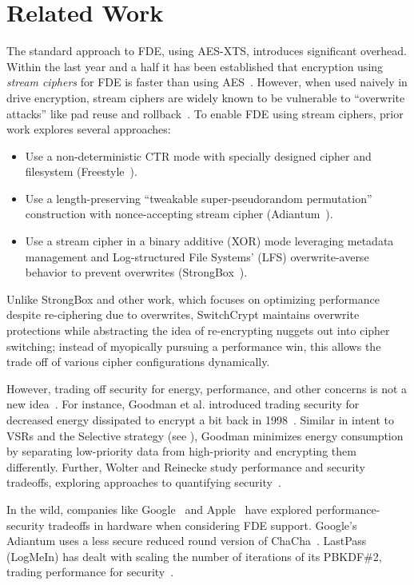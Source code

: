 \section{Related Work}\label{sec:related}

The standard approach to FDE, using AES-XTS, introduces significant overhead.
Within the last year and a half it has been established that encryption using
\emph{stream ciphers} for FDE is faster than using AES~\cite{StrongBox,
AnotherPaper1, AnotherPaper2}. However, when used naively in drive encryption,
stream ciphers are widely known to be vulnerable to ``overwrite attacks'' like
pad reuse and rollback~\cite{KatzLindell, StrongBox}. To enable FDE using stream
ciphers, prior work explores several approaches:

\begin{itemize}
   \item Use a non-deterministic CTR mode with specially designed cipher and
   filesystem (Freestyle~\cite{Freestyle}).
   \item Use a length-preserving ``tweakable super-pseudorandom permutation''
   construction with nonce-accepting stream cipher (Adiantum~\cite{Adiantum}).
   \item Use a stream cipher in a binary additive (XOR) mode leveraging metadata
   management and Log-structured File Systems' (LFS) overwrite-averse behavior
   to prevent overwrites (StrongBox~\cite{StrongBox}).
\end{itemize}

Unlike StrongBox and other work, which focuses on optimizing performance despite
re-ciphering due to overwrites, SwitchCrypt maintains overwrite protections
while abstracting the idea of re-encrypting nuggets out into cipher switching;
instead of myopically pursuing a performance win, this allows the trade off of
various cipher configurations dynamically.

However, trading off security for energy, performance, and other concerns is not
a new idea~\cite{ScalableSecurity, WolterReinecke, ZengChow1, ZengChow2,
HaleemEtAl, LiOmiecinski}. For instance, Goodman et al. introduced trading
security for decreased energy dissipated to encrypt a bit back in
1998~\cite{ScalableSecurity}. Similar in intent to VSRs and the Selective
strategy (see ), Goodman minimizes energy consumption by
separating low-priority data from high-priority and encrypting them differently.
Further, Wolter and Reinecke study performance and security tradeoffs, exploring
approaches to quantifying security~\cite{WolterReinecke}.

In the wild, companies like Google~\cite{AndroidM} and Apple~\cite{iOSFDE} have
explored performance-security tradeoffs in hardware when considering FDE
support. Google's Adiantum uses a less secure reduced round version of
ChaCha~\cite{Adiantum}. LastPass (LogMeIn) has dealt with scaling the number of
iterations of its PBKDF\#2, trading performance for security~\cite{LastPass}.

